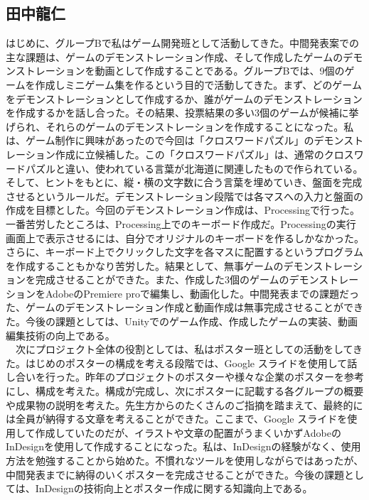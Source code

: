 \subsection{田中龍仁}
はじめに、グループBで私はゲーム開発班として活動してきた。中間発表案での主な課題は、ゲームのデモンストレーション作成、そして作成したゲームのデモンストレーションを動画として作成することである。グループBでは、9個のゲームを作成しミニゲーム集を作るという目的で活動してきた。まず、どのゲームをデモンストレーションとして作成するか、誰がゲームのデモンストレーションを作成するかを話し合った。その結果、投票結果の多い3個のゲームが候補に挙げられ、それらのゲームのデモンストレーションを作成することになった。私は、ゲーム制作に興味があったので今回は「クロスワードパズル」のデモンストレーション作成に立候補した。この「クロスワードパズル」は、通常のクロスワードパズルと違い、使われている言葉が北海道に関連したもので作られている。そして、ヒントをもとに、縦・横の文字数に合う言葉を埋めていき、盤面を完成させるというルールだ。デモンストレーション段階では各マスへの入力と盤面の作成を目標とした。今回のデモンストレーション作成は、Processingで行った。一番苦労したところは、Processing上でのキーボード作成だ。Processingの実行画面上で表示させるには、自分でオリジナルのキーボードを作るしかなかった。さらに、キーボード上でクリックした文字を各マスに配置するというプログラムを作成することもかなり苦労した。結果として、無事ゲームのデモンストレーションを完成させることができた。また、作成した3個のゲームのデモンストレーションをAdobeのPremiere proで編集し、動画化した。中間発表までの課題だった、ゲームのデモンストレーション作成と動画作成は無事完成させることができた。今後の課題としては、Unityでのゲーム作成、作成したゲームの実装、動画編集技術の向上である。\\
　次にプロジェクト全体の役割としては、私はポスター班としての活動をしてきた。はじめのポスターの構成を考える段階では、Google スライドを使用して話し合いを行った。昨年のプロジェクトのポスターや様々な企業のポスターを参考にし、構成を考えた。構成が完成し、次にポスターに記載する各グループの概要や成果物の説明を考えた。先生方からのたくさんのご指摘を踏まえて、最終的には全員が納得する文章を考えることができた。ここまで、Google スライドを使用して作成していたのだが、イラストや文章の配置がうまくいかずAdobeのInDesignを使用して作成することになった。私は、InDesignの経験がなく、使用方法を勉強することから始めた。不慣れなツールを使用しながらではあったが、中間発表までに納得のいくポスターを完成させることができた。今後の課題としては、InDesignの技術向上とポスター作成に関する知識向上である。

